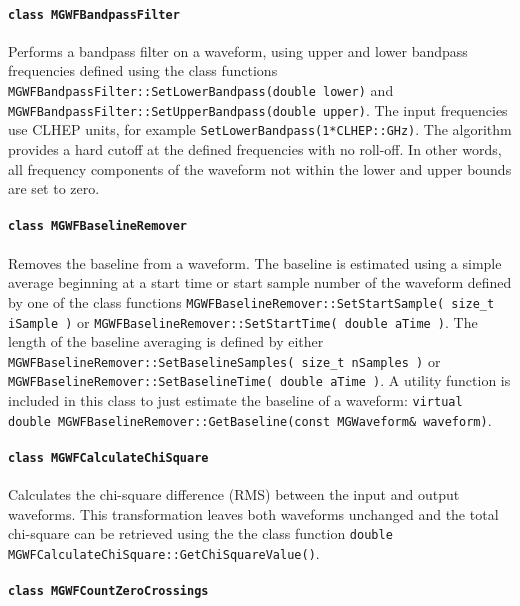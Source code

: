 			\paragraph{\lstinline!class MGWFBandpassFilter!} 

Performs a bandpass filter on a waveform, using upper and lower bandpass frequencies defined using the class functions \lstinline!MGWFBandpassFilter::SetLowerBandpass(double lower)! and \lstinline!MGWFBandpassFilter::SetUpperBandpass(double upper)!.  The input frequencies use CLHEP units, for example \lstinline!SetLowerBandpass(1*CLHEP::GHz)!.  The algorithm provides a hard cutoff at the defined frequencies with no roll-off.  In other words, all frequency components of the waveform not within the lower and upper bounds are set to zero.
			
			\paragraph{\lstinline!class MGWFBaselineRemover!} 

Removes the baseline from a waveform.  The baseline is estimated using a simple average beginning at a start time or start sample number of the waveform defined by one of the class functions \lstinline!MGWFBaselineRemover::SetStartSample( size_t iSample )! or \lstinline!MGWFBaselineRemover::SetStartTime( double aTime )!.  The length of the baseline averaging is defined by either \lstinline!MGWFBaselineRemover::SetBaselineSamples( size_t nSamples )! or \lstinline!MGWFBaselineRemover::SetBaselineTime( double aTime )!.  A utility function is included in this class to just estimate the baseline of a waveform: \lstinline!virtual double MGWFBaselineRemover::GetBaseline(const MGWaveform& waveform)!.

			\paragraph{\lstinline!class MGWFCalculateChiSquare!} 

Calculates the chi-square difference (RMS) between the input and output waveforms.  This transformation leaves both waveforms unchanged and the total chi-square can be retrieved using the the class function \lstinline!double MGWFCalculateChiSquare::GetChiSquareValue()!.

			\paragraph{\lstinline!class MGWFCountZeroCrossings!} 

